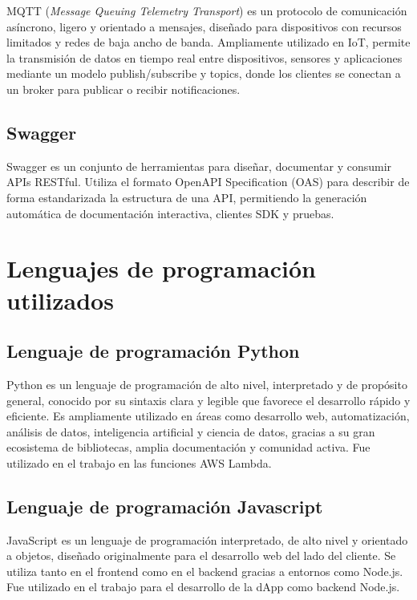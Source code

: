 MQTT (\textit{Message Queuing Telemetry Transport}) \citep{mqtt_spec} es un protocolo de comunicación asíncrono, ligero y orientado a mensajes, diseñado para dispositivos con recursos limitados y redes de baja ancho de banda. Ampliamente utilizado en IoT, permite la transmisión de datos en tiempo real entre dispositivos, sensores y aplicaciones mediante un modelo publish/subscribe y topics, donde los clientes se conectan a un broker para publicar o recibir notificaciones.


\subsection{Swagger}
Swagger \citep{open_api} es un conjunto de herramientas para diseñar, documentar y consumir APIs RESTful. Utiliza el formato OpenAPI Specification (OAS) para describir de forma estandarizada la estructura de una API, permitiendo la generación automática de documentación interactiva, clientes SDK y pruebas.




\section{Lenguajes de programación utilizados}

\subsection{Lenguaje de programación Python}
Python es un lenguaje de programación de alto nivel, interpretado y de propósito general, conocido por su sintaxis clara y legible que favorece el desarrollo rápido y eficiente. Es ampliamente utilizado en áreas como desarrollo web, automatización, análisis de datos, inteligencia artificial y ciencia de datos, gracias a su gran ecosistema de bibliotecas, amplia documentación y comunidad activa. Fue utilizado en el trabajo en las funciones AWS Lambda.


\subsection{Lenguaje de programación Javascript}
JavaScript es un lenguaje de programación interpretado, de alto nivel y orientado a objetos, diseñado originalmente para el desarrollo web del lado del cliente. Se utiliza tanto en el frontend como en el backend gracias a entornos como Node.js. Fue utilizado en el trabajo para el desarrollo de la dApp como backend Node.js.


